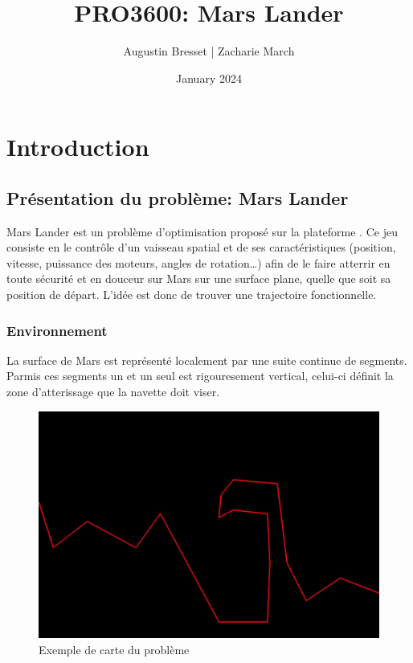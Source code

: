 \documentclass[french,a4paper,10pt,twocolumn]{article}
\title{PRO3600: Mars Lander}
\author{Augustin Bresset | Zacharie March}
\date{January 2024}
\begin{document}
\maketitle

\section{Introduction}

\subsection{Présentation du problème: Mars Lander}

Mars Lander est un problème d'optimisation proposé sur la plateforme \cite[]{codingame_mars_lander}.
Ce jeu consiste en le contrôle d'un vaisseau spatial et de ses caractéristiques (position, vitesse, puissance des moteurs, angles de rotation…) 
afin de le faire atterrir en toute sécurité et en douceur sur Mars sur une surface plane, quelle que soit sa position de départ. 
L'idée est donc de trouver une trajectoire fonctionnelle.

\subsubsection{Environnement}

La surface de Mars est représenté localement par une suite continue de segments.
Parmis ces segments un et un seul est rigouresement vertical, celui-ci définit la zone d'atterissage que la navette doit viser.

\begin{figure}[h]
    \centering
    \includegraphics[scale=0.2]{images/cave_map.jpeg}
    \caption{Exemple de carte du problème}
    \label{fig:map}
\end{figure}
\end{document}

